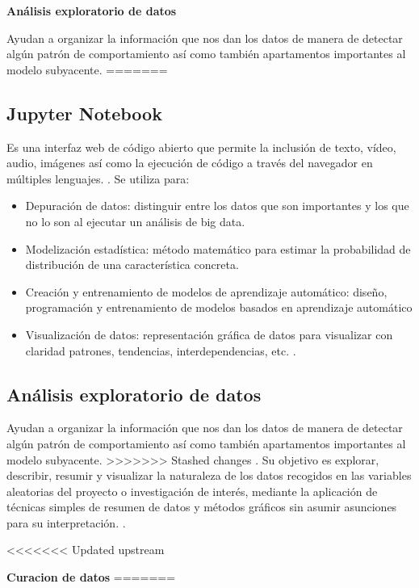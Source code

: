 \documentclass[12pt,letterpaper]{article}
\begin{document}
\item\textbf{An\'alisis exploratorio de datos}
\item Ayudan a organizar la informaci\'on que nos dan los datos de manera de detectar alg\'un patr\'on de comportamiento as\'i como tambi\'en apartamentos importantes al modelo subyacente.
=======
\subsection*{Jupyter Notebook}
Es una interfaz web de c\'odigo abierto que permite la inclusi\'on de texto, v\'ideo, audio, im\'agenes as\'i como la ejecuci\'on de c\'odigo a trav\'es del navegador en m\'ultiples lenguajes. 
\cite[(Cabrera, E. y Diaz, E. s.f.)]{ref10}.
Se utiliza para: 
\begin{itemize}
\item Depuraci\'on de datos: distinguir entre los datos que son importantes y los que no lo son al ejecutar un an\'alisis de big data.
\item Modelizaci\'on estad\'istica: m\'etodo matem\'atico para estimar la probabilidad de distribuci\'on de una caracter\'istica concreta.
\item Creaci\'on y entrenamiento de modelos de aprendizaje autom\'atico: diseño, programaci\'on y entrenamiento de modelos basados en aprendizaje autom\'atico
\item Visualizaci\'on de datos: representaci\'on gr\'afica de datos para visualizar con claridad patrones, tendencias, interdependencias, etc.
\cite[(Digital Guide IONOS. s.f.)]{ref11}.
\end{itemize}

\subsection*{An\'alisis exploratorio de datos}
Ayudan a organizar la informaci\'on que nos dan los datos de manera de detectar alg\'un patr\'on de comportamiento as\'i como tambi\'en apartamentos importantes al modelo subyacente.
>>>>>>> Stashed changes
\cite[(Orellana, L. s.f.)]{ref12}.
Su objetivo es explorar, describir, resumir y visualizar la naturaleza de los datos recogidos en las variables aleatorias del proyecto o investigaci\'on de inter\'es, mediante la aplicaci\'on de t\'ecnicas simples de resumen de datos y m\'etodos gr\'aficos sin asumir asunciones para su interpretaci\'on.
\cite[(Helix Bios. s.f.)]{ref13}.

<<<<<<< Updated upstream
\item\textbf{Curacion de datos}
=======
\end{document}

